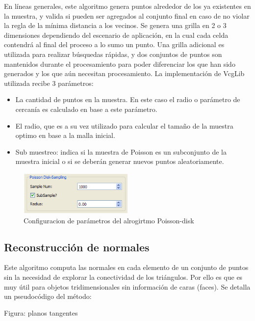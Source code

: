 En líneas generales, este algoritmo genera puntos alrededor de los ya existentes en la muestra, y valida si pueden ser agregados al conjunto final en caso de no violar la regla de la mínima distancia a los vecinos. Se genera una grilla en 2 o 3 dimensiones dependiendo del escenario de aplicación, en la cual cada celda contendrá al final del proceso a lo sumo un punto. Una grilla adicional es utilizada para realizar búsquedas rápidas, y dos conjuntos de puntos son mantenidos durante el procesamiento para poder diferenciar los que han sido generados y los que aún necesitan procesamiento.
La implementación de VcgLib utilizada recibe 3 parámetros:
\begin{itemize}
	\item La cantidad de puntos en la muestra. En este caso el radio o parámetro de cercanía es calculado en base a este parámetro.
	\item El radio, que es a su vez utilizado para calcular el tamaño de la muestra optimo en base a la malla inicial.
	\item Sub muestreo: indica si la muestra de Poisson es un subconjunto de la muestra inicial o si se deberán generar nuevos puntos aleatoriamente.
\end{itemize}

\begin{figure}[H]
  \centering
    \includegraphics[width=0.5\textwidth]{./Cap6_reconstruccion/malla-poissongui.png}
  \caption{Configuracion de parámetros del alrogirtmo Poisson-disk}
  \label{fig:Mesh-PoissonGui}
\end{figure}

\subsection{Reconstrucción de normales}

Este algoritmo computa las normales en cada elemento de un conjunto de puntos sin la necesidad de explorar la conectividad de los triángulos. Por ello es que es muy útil para objetos tridimensionales sin información de caras (faces).
Se detalla un pseudocódigo del método:

Figura: planos tangentes

